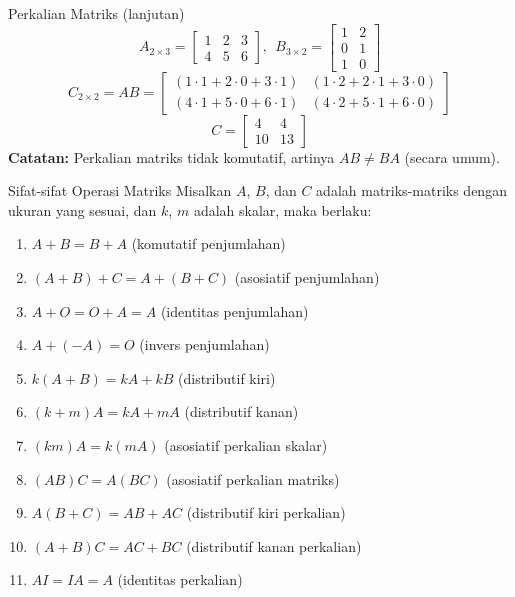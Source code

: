 \documentclass{beamer}
\begin{document}
\begin{frame}[t,fragile]{Perkalian Matriks (lanjutan)}
$$ A_{2 \times 3} = \begin{bmatrix}
       	1 & 2 & 3 \\
	    4 & 5 & 6
        \end{bmatrix}, ~~ B_{3 \times 2} = \begin{bmatrix}
       	1 & 2 \\
	    0 & 1 \\
        1 & 0
        \end{bmatrix} $$
\vspace{0.3cm}
$$ C_{2 \times 2} = AB = \begin{bmatrix}
       	(1 \cdot 1 + 2 \cdot 0 + 3 \cdot 1) & (1 \cdot 2 + 2 \cdot 1 + 3 \cdot 0) \\
	    (4 \cdot 1 + 5 \cdot 0 + 6 \cdot 1) & (4 \cdot 2 + 5 \cdot 1 + 6 \cdot 0)
        \end{bmatrix} $$
\vspace{0.3cm}
$$ C = \begin{bmatrix}
       	4 & 4 \\
	    10 & 13
        \end{bmatrix} $$
\vspace{0.2cm}
\textbf{Catatan:} Perkalian matriks tidak komutatif, artinya $AB \neq BA$ (secara umum).
\end{frame}

\begin{frame}[t,fragile]{Sifat-sifat Operasi Matriks}
Misalkan $A$, $B$, dan $C$ adalah matriks-matriks dengan ukuran yang sesuai, dan $k$, $m$ adalah skalar, maka berlaku:
\begin{enumerate}
\item $A + B = B + A$ (komutatif penjumlahan)
\item $(A + B) + C = A + (B + C)$ (asosiatif penjumlahan)
\item $A + O = O + A = A$ (identitas penjumlahan)
\item $A + (-A) = O$ (invers penjumlahan)
\item $k(A + B) = kA + kB$ (distributif kiri)
\item $(k + m)A = kA + mA$ (distributif kanan)
\item $(km)A = k(mA)$ (asosiatif perkalian skalar)
\item $(AB)C = A(BC)$ (asosiatif perkalian matriks)
\item $A(B + C) = AB + AC$ (distributif kiri perkalian)
\item $(A + B)C = AC + BC$ (distributif kanan perkalian)
\item $AI = IA = A$ (identitas perkalian)
\end{enumerate}
\end{frame}
\end{document}
